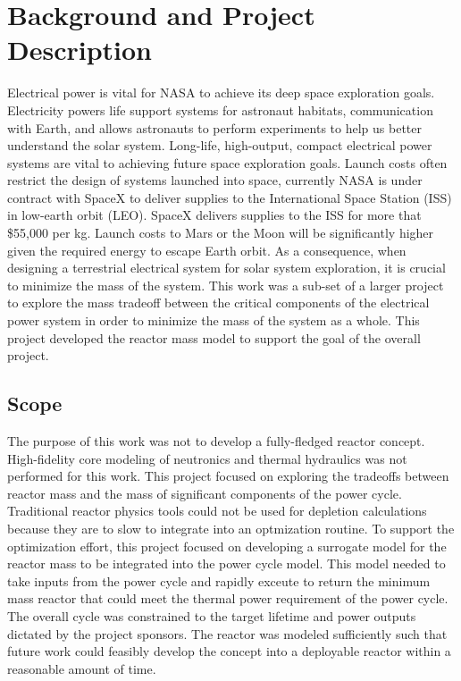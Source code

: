 \chapter{Background and Project Description}
Electrical power is vital for NASA to achieve its deep space exploration goals.
Electricity powers life support systems for astronaut habitats, communication
with Earth, and allows astronauts to perform experiments to help us better
understand the solar system. Long-life, high-output, compact electrical power
systems are vital to achieving future space exploration goals. Launch costs 
often restrict the design of systems launched
into space, currently NASA is under contract with SpaceX to deliver supplies to
the International Space Station (ISS) in low-earth orbit (LEO). SpaceX delivers
supplies to the ISS for more that \$55,000 per kg. Launch costs to Mars or the
Moon will be significantly higher given the required energy to escape Earth
orbit. As a consequence, when designing a terrestrial electrical system for
solar system exploration, it is crucial to minimize the mass of the system. This
work was a sub-set of a larger
project to explore the mass tradeoff between the critical components of the
electrical power system in order to minimize the mass of the system as a whole.
This project developed the reactor mass model to support the goal of the overall
project.

\section{Scope}
The purpose of this work was not to develop a fully-fledged reactor concept.
High-fidelity core modeling of neutronics and thermal hydraulics was not
performed for this work.
This project focused on exploring the tradeoffs between reactor mass and the
mass of significant components of the power cycle. Traditional reactor physics
tools could not be used for depletion calculations because they are to slow to
integrate into an optmization routine. To support the optimization effort, this project focused on
developing a surrogate model for the reactor mass to be integrated into the
power cycle model. This model needed to take inputs from the power cycle and
rapidly exceute to return the minimum mass reactor that could meet the thermal
power requirement of the power cycle. The overall cycle was constrained to the
target lifetime and power outputs dictated by the project sponsors. The reactor
was modeled sufficiently such that future work could feasibly develop the
concept into a deployable reactor within a reasonable amount of time.


